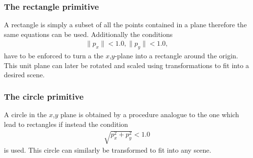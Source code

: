 \subsubsection{The rectangle primitive}
A rectangle is simply a subset of all the points contained in a plane therefore the same equations can be used. Additionally the conditions
\begin{align}
\|p_x\| < 1.0,
\|p_y\| < 1.0,
\end{align}
have to be enforced to turn a the $x$,$y$-plane into a rectangle around the origin. This unit plane can later be rotated and scaled using transformations to fit into a desired scene.

\subsubsection{The circle primitive}
A circle in the $x$,$y$ plane is obtained by a procedure analogue to the one which lead to rectangles if instead the condition
\begin{align}
\sqrt{p_x^2 + p_y^2} < 1.0
\end{align}
is used. This circle can similarly be transformed to fit into any scene. 

